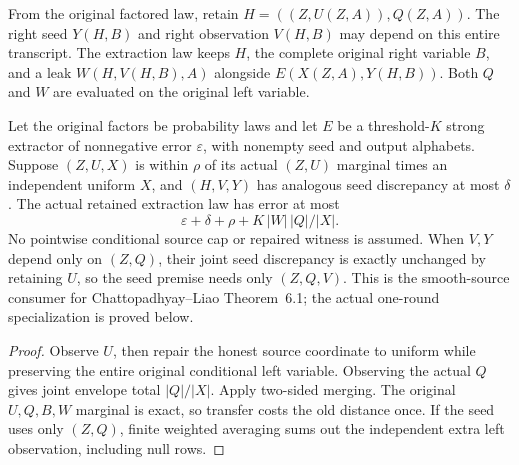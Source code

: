 \begin{definition}
  \label{def:lowerbounds-algebraic-smooth-merging}
  \leanok
  From the original factored law, retain
  $H=((Z,U(Z,A)),Q(Z,A))$. The right seed $Y(H,B)$ and right
  observation $V(H,B)$ may depend on this entire transcript.
  The extraction law keeps $H$, the complete original right variable
  $B$, and a leak $W(H,V(H,B),A)$ alongside $E(X(Z,A),Y(H,B))$.
  Both $Q$ and $W$ are evaluated on the original left variable.
\end{definition}

\begin{theorem}
  \label{thm:lowerbounds-algebraic-smooth-merging}
  \leanok
  Let the original factors be probability laws and let $E$ be a
  threshold-$K$ strong extractor of nonnegative error $\varepsilon$, with
  nonempty seed and output alphabets. Suppose $(Z,U,X)$ is within
  $\rho$ of its actual $(Z,U)$ marginal times an independent uniform $X$,
  and $(H,V,Y)$ has analogous seed discrepancy at most $\delta$.
  The actual retained extraction law has error at most
  \[
    \varepsilon+\delta+\rho+K\,|W|\,|Q|/|X|.
  \]
  No pointwise conditional source cap or repaired witness is assumed.
  When $V,Y$ depend only on $(Z,Q)$, their joint seed discrepancy is
  exactly unchanged by retaining $U$, so the seed premise needs only
  $(Z,Q,V)$. This is the smooth-source consumer for
  Chattopadhyay--Liao Theorem~6.1; the actual one-round specialization
  is proved below.
\end{theorem}
\begin{proof}
  \leanok
  Observe $U$, then repair the honest source coordinate to uniform
  while preserving the entire original conditional left variable.
  Observing the actual $Q$ gives joint envelope total $|Q|/|X|$.
  Apply two-sided merging. The original $U,Q,B,W$ marginal is exact,
  so transfer costs the old distance once. If the seed uses only
  $(Z,Q)$, finite weighted averaging sums out the independent extra
  left observation, including null rows.
\end{proof}


